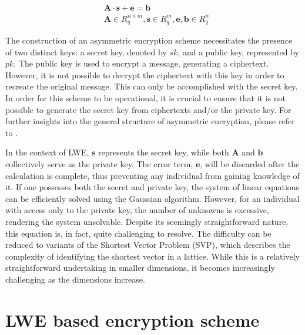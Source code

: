 \begin{equation}
  \begin{split}
     & \textbf{A}\cdot \textbf{s} + \textbf{e}= \textbf{b}                                      \\
     & \textbf{A} \in R_q^{n \times m}, \textbf{s} \in R_q^m, \textbf{e}, \textbf{b} \in R_q^n
  \end{split}
  \label{eq:mainLwe}
\end{equation}

The construction of an asymmetric encryption scheme necessitates the presence of two distinct keys: a secret key, denoted by $sk$, and a public key, represented by $pk$. The public key is used to encrypt a message, generating a ciphertext. However, it is not possible to decrypt the ciphertext with this key in order to recreate the original message. This can only be accomplished with the secret key. In order for this scheme to be operational, it is crucial to ensure that it is not possible to generate the secret key from ciphertexts and/or the private key. For further insights into the general structure of asymmetric encryption, please refer to \cite{Eckert2018}.

In the context of LWE, $\textbf{s}$ represents the secret key, while both $\textbf{A}$ and $\textbf{b}$ collectively serve as the private key. The error term, $\textbf{e}$, will be discarded after the calculation is complete, thus preventing any individual from gaining knowledge of it. If one possesses both the secret and private key, the system of linear equations can be efficiently solved using the Gaussian algorithm. However, for an individual with access only to the private key, the number of unknowns is excessive, rendering the system unsolvable. Despite its seemingly straightforward nature, this equation is, in fact, quite challenging to resolve. The difficulty can be reduced to variants of the Shortest Vector Problem (SVP), which describes the complexity of identifying the shortest vector in a lattice. While this is a relatively straightforward undertaking in smaller dimensions, it becomes increasingly challenging as the dimensions increase.


\section{LWE based encryption scheme}
\label{sec:Lwe-Encryption}

